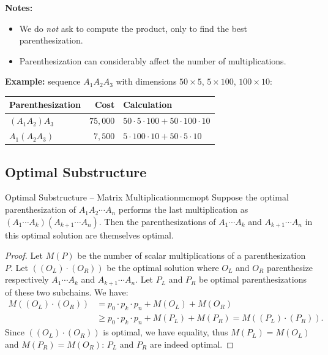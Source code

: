 \textbf{Notes:}
\begin{itemize}
  \item We do \emph{not} ask to compute the product, only to find the
        best parenthesization.
  \item Parenthesization can considerably affect the number of
        multiplications.
\end{itemize}

\textbf{Example:} sequence $A_1 A_2 A_3$ with dimensions $50\times5$, $5\times100$,
$100\times10$:

\begin{center}
\renewcommand{\arraystretch}{1.3}
\begin{tabular}{lrl}
\toprule
\textbf{Parenthesization} & \textbf{Cost} & \textbf{Calculation} \\
\midrule
$(A_1 A_2) A_3$ & $75,000$ & $50\cdot5\cdot100 + 50\cdot100\cdot10$ \\
$A_1 (A_2 A_3)$ & $7,500$  & $5\cdot100\cdot10 + 50\cdot5\cdot10$ \\
\bottomrule
\end{tabular}
\end{center}

\subsection{Optimal Substructure}

\begin{theorem}{Optimal Substructure – Matrix Multiplication}{mcmopt}
Suppose the optimal parenthesization of $A_1 A_2 \cdots A_n$ performs the
last multiplication as $(A_1 \cdots A_k)(A_{k+1} \cdots A_n)$. Then the
parenthesizations of $A_1 \cdots A_k$ and $A_{k+1} \cdots A_n$ in this
optimal solution are themselves optimal.
\end{theorem}

\begin{proof}
Let $M(P)$ be the number of scalar multiplications of a parenthesization $P$.
Let $((O_L) \cdot (O_R))$ be the optimal solution where $O_L$ and $O_R$ parenthesize
respectively $A_1\cdots A_k$ and $A_{k+1}\cdots A_n$. Let $P_L$ and $P_R$ be
optimal parenthesizations of these two subchains. We have:
\begin{align*}
  M((O_L) \cdot (O_R))
    &= p_0 \cdot p_k \cdot p_n + M(O_L) + M(O_R) \\
    &\ge p_0 \cdot p_k \cdot p_n + M(P_L) + M(P_R)
     = M((P_L) \cdot (P_R)).
\end{align*}
Since $((O_L)\cdot(O_R))$ is optimal, we have equality, thus
$M(P_L) = M(O_L)$ and $M(P_R) = M(O_R)$: $P_L$ and $P_R$ are indeed optimal.
\end{proof}

